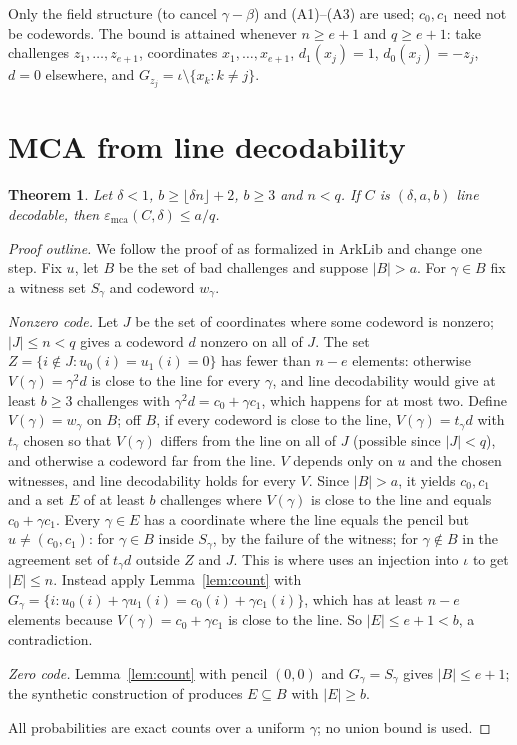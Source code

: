 \documentclass[11pt]{article}
\newtheorem{theorem}{Theorem}
\theoremstyle{definition}
\theoremstyle{remark}
\newcommand{\mca}{\varepsilon_{\mathrm{mca}}}
\begin{document}
Only the field structure (to cancel $\gamma-\beta$) and (A1)--(A3) are used; $c_0,c_1$ need not be
codewords. The bound is attained whenever $n\ge e+1$ and $q\ge e+1$: take challenges
$z_1,\dots,z_{e+1}$, coordinates $x_1,\dots,x_{e+1}$, $d_1(x_j)=1$, $d_0(x_j)=-z_j$, $d=0$
elsewhere, and $G_{z_j}=\iota\setminus\{x_k:k\ne j\}$.

\section{MCA from line decodability}

\begin{theorem}\label{thm:mca}
Let $\delta<1$, $b\ge\lfloor\delta n\rfloor+2$, $b\ge3$ and $n<q$. If $C$ is $(\delta,a,b)$ line
decodable, then $\mca(C,\delta)\le a/q$.
\end{theorem}

\begin{proof}[Proof outline]
We follow the proof of \cite[Thm.~3.5]{GG25} as formalized in ArkLib and change one step. Fix
$u$, let $B$ be the set of bad challenges and suppose $|B|>a$. For $\gamma\in B$ fix a witness
set $S_\gamma$ and codeword $w_\gamma$.

\emph{Nonzero code.} Let $J$ be the set of coordinates where some codeword is nonzero; $|J|\le n<q$
gives a codeword $d$ nonzero on all of $J$. The set
$Z=\{i\notin J: u_0(i)=u_1(i)=0\}$ has fewer than $n-e$ elements: otherwise $V(\gamma)=\gamma^2d$
is close to the line for every $\gamma$, and line decodability would give at least $b\ge3$
challenges with $\gamma^2d=c_0+\gamma c_1$, which happens for at most two. Define $V(\gamma)=w_\gamma$
on $B$; off $B$, if every codeword is close to the line, $V(\gamma)=t_\gamma d$ with $t_\gamma$
chosen so that $V(\gamma)$ differs from the line on all of $J$ (possible since $|J|<q$), and
otherwise a codeword far from the line. $V$ depends only on $u$ and the chosen witnesses, and
line decodability holds for every $V$. Since $|B|>a$, it yields $c_0,c_1$ and a set $E$ of at least
$b$ challenges where $V(\gamma)$ is close to the line and equals $c_0+\gamma c_1$.
Every $\gamma\in E$ has a coordinate where the line equals the pencil but $u\ne(c_0,c_1)$: for
$\gamma\in B$ inside $S_\gamma$, by the failure of the witness; for $\gamma\notin B$ in the
agreement set of $t_\gamma d$ outside $Z$ and $J$. This is where \cite{GG25} uses an injection
into $\iota$ to get $|E|\le n$. Instead apply Lemma~\ref{lem:count} with
$G_\gamma=\{i:u_0(i)+\gamma u_1(i)=c_0(i)+\gamma c_1(i)\}$, which has at least $n-e$ elements
because $V(\gamma)=c_0+\gamma c_1$ is close to the line. So $|E|\le e+1<b$, a contradiction.

\emph{Zero code.} Lemma~\ref{lem:count} with pencil $(0,0)$ and $G_\gamma=S_\gamma$ gives
$|B|\le e+1$; the synthetic construction of \cite{GG25} produces $E\subseteq B$ with $|E|\ge b$.

All probabilities are exact counts over a uniform $\gamma$; no union bound is used.
\end{proof}
\end{document}
